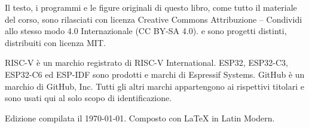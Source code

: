 {\noindent
Il testo, i programmi e le figure originali di questo libro, come tutto il
materiale del corso, sono rilasciati con licenza Creative Commons
Attribuzione -- Condividi allo stesso modo 4.0 Internazionale (CC BY-SA 4.0).
\prg e \prgqt sono progetti distinti, distribuiti con licenza MIT.\par
\vspace{1em}


\vspace{1em}

\noindent
RISC\nobreakdash-V è un marchio registrato di RISC\nobreakdash-V
International. ESP32, ESP32\nobreakdash-C3, ESP32\nobreakdash-C6 ed
ESP\nobreakdash-IDF sono prodotti e marchi di Espressif Systems. GitHub è un
marchio di GitHub, Inc. Tutti gli altri marchi appartengono ai rispettivi
titolari e sono usati qui al solo scopo di identificazione.\par
\vspace{1em}

\noindent
Edizione compilata il \today. Composto con \LaTeX{} in Latin Modern.\par
}
\vspace*{\fill}
\clearpage
